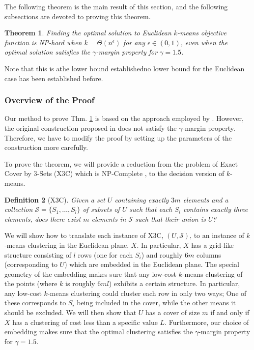 \documentclass{article}
\newcommand{\mc}{\mathcal}
\newtheorem{theorem}{Theorem}
\newtheorem{definition}[theorem]{Definition}
\begin{document}
The following theorem is the main result of this section, and the following subsections are devoted to proving this theorem. 

\begin{theorem}
\label{thm:gammaLower}
Finding the optimal solution to Euclidean $k$-means objective function is NP-hard when $k=\Theta(n^\epsilon)$ for any $\epsilon \in (0,1)$, even when the optimal solution satisfies the $\gamma$-margin property for $\gamma = 1.5$.
\end{theorem}

Note that this is athe lower bound establishedno lower bound for the Euclidean case has been established before.

\subsubsection{Overview of the Proof}

Our method to prove Thm. \ref{thm:gammaLower} is based on the approach employed by \cite{vattani2009hardness}. However, the original construction proposed in \cite{vattani2009hardness} does not satisfy the $\gamma$-margin property. Therefore, we have to modify the proof by setting up the parameters of the construction more carefully. 

To prove the theorem, we will provide a reduction from the problem of Exact Cover by 3-Sets (X3C) which is NP-Complete \cite{garey2002computers}, to the decision version of $k$-means.

\begin{definition}[X3C]
Given a set $U$ containing exactly $3m$ elements and a collection $\mc S = \{S_1, \ldots, S_l\}$ of subsets of $U$ such that each $S_i$ contains exactly three elements, does there exist $m$ elements in $\mc S$ such that their union is $U$? 
\end{definition}

We will show how to translate each instance of X3C, $(U,\mc S)$, to an instance of $k$-means clustering in the Euclidean plane, $X$. In particular, $X$ has a grid-like structure consisting of $l$ rows (one for each $S_i$) and roughly $6m$ columns (corresponding to $U$) which are embedded in the Euclidean plane. The special geometry of the embedding makes sure that any low-cost $k$-means clustering of the points (where $k$ is roughly $6ml$) exhibits a certain structure. In particular, any low-cost $k$-means clustering could cluster each row in only two ways; One of these corresponds to $S_i$ being included in the cover, while the other means it should be excluded. We will then show that $U$ has a cover of size $m$ if and only if $X$ has a clustering of cost less than a specific value $L$. Furthermore, our choice of embedding makes sure that the optimal clustering satisfies the $\gamma$-margin property for $\gamma=1.5$.
\end{document}
